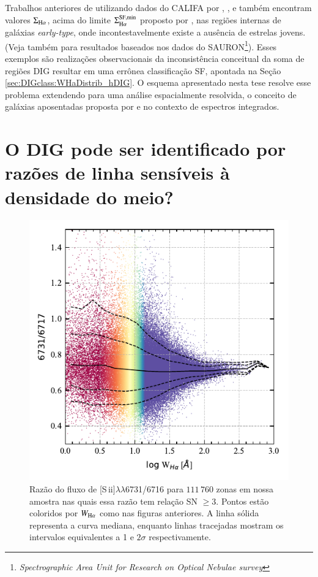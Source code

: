 Trabalhos anteriores de utilizando dados do CALIFA por \citet{Kehrig.etal.2012}, \citet{Singh.etal.2013}, e \citet{Gomes.etal.2016b} também encontram valores $\Sigma_{\Ha}$, acima do limite $\Sigma^{\rm SF,min}_{\Ha}$ proposto por \citet{Zhang.etal.2017a}, nas regiões internas de galáxias {\em early-type}, onde incontestavelmente existe a ausência de estrelas jovens. (Veja também \citealt{Sarzi.etal.2010} para resultados baseados nos dados do SAURON\footnote{\em Spectrographic Area Unit for Research on Optical Nebulae survey}). Esses exemplos são realizações observacionais da inconsistência conceitual da soma de regiões DIG resultar em uma errônea classificação SF, apontada na Seção \ref{sec:DIGclass:WHaDistrib_hDIG}. O esquema apresentado nesta tese resolve esse problema extendendo para uma análise espacialmente resolvida, o conceito de galáxias aposentadas proposta por \citet{Stasinska.etal.2008a} e \citet{CidFernandes.etal.2011a} no contexto de espectros integrados.


\section{O DIG pode ser identificado por razões de linha sensíveis à densidade do meio?}
\label{sec:DIGdisc:nSii}

\begin{figure}
 \includegraphics{figuras/fig_SII_logWHa_SNR3.pdf}
 \caption[$\log$ \sii$\times \log W_{{\rm H}\alpha}$]
 {Razão do fluxo de [S\,{\sc ii}]$\lambda\lambda$6731/6716 para $111\,760$ zonas em nossa amostra nas quais essa razão tem relação SN $\ge 3$. Pontos estão coloridos por $W_{\Ha}$ como nas figuras anteriores. A linha sólida representa a curva mediana, enquanto linhas tracejadas mostram os intervalos equivalentes a 1 e $2\sigma$ respectivamente.}
 \label{fig:S2_WHa}
\end{figure}

